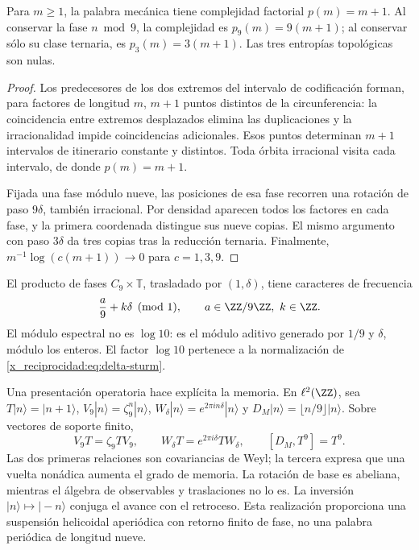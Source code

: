 

\begin{theorem}
Para \(m\ge1\), la palabra mecánica tiene complejidad factorial \(p(m)=m+1\). Al conservar la fase \(n\bmod9\), la complejidad es \(p_9(m)=9(m+1)\); al conservar sólo su clase ternaria, es \(p_3(m)=3(m+1)\). Las tres entropías topológicas son nulas.
\end{theorem}
\begin{proof}
Los predecesores de los dos extremos del intervalo de codificación forman, para factores de longitud \(m\), \(m+1\) puntos distintos de la circunferencia: la coincidencia entre extremos desplazados elimina las duplicaciones y la irracionalidad impide coincidencias adicionales. Esos puntos determinan \(m+1\) intervalos de itinerario constante y distintos. Toda órbita irracional visita cada intervalo, de donde \(p(m)=m+1\).

Fijada una fase módulo nueve, las posiciones de esa fase recorren una rotación de paso \(9\delta\), también irracional. Por densidad aparecen todos los factores en cada fase, y la primera coordenada distingue sus nueve copias. El mismo argumento con paso \(3\delta\) da tres copias tras la reducción ternaria. Finalmente, \(m^{-1}\log(c(m+1))\to0\) para \(c=1,3,9\).
\end{proof}

El producto de fases \(C_9\times\mathbb T\), trasladado por \((1,\delta)\), tiene caracteres de frecuencia
\[
 \frac a9+k\delta\pmod1,\qquad a\in\ZZ/9\ZZ,\ k\in\ZZ.
\]
El módulo espectral no es \(\log10\): es el módulo aditivo generado por \(1/9\) y \(\delta\), módulo los enteros. El factor \(\log10\) pertenece a la normalización de \eqref{x_reciprocidad:eq:delta-sturm}.

Una presentación operatoria hace explícita la memoria. En \(\ell^2(\ZZ)\), sea \(T|n\rangle=|n+1\rangle\), \(V_9|n\rangle=\zeta_9^n|n\rangle\), \(W_\delta|n\rangle=e^{2\pi i n\delta}|n\rangle\) y \(D_M|n\rangle=\lfloor n/9\rfloor|n\rangle\). Sobre vectores de soporte finito,
\begin{equation}
 V_9T=\zeta_9TV_9,\qquad
 W_\delta T=e^{2\pi i\delta}TW_\delta,\qquad
 [D_M,T^9]=T^9.
 \label{x_reciprocidad:eq:weyl-relojes}
\end{equation}
Las dos primeras relaciones son covariancias de Weyl; la tercera expresa que una vuelta nonádica aumenta el grado de memoria. La rotación de base es abeliana, mientras el álgebra de observables y traslaciones no lo es. La inversión \(|n\rangle\mapsto|-n\rangle\) conjuga el avance con el retroceso. Esta realización proporciona una suspensión helicoidal aperiódica con retorno finito de fase, no una palabra periódica de longitud nueve.


